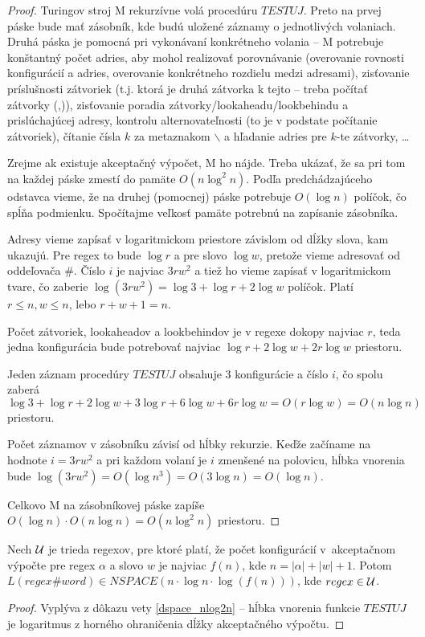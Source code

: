 \begin{proof}
Turingov stroj M rekurzívne volá procedúru $TESTUJ$. Preto na prvej páske bude mať zásobník, kde budú uložené záznamy o jednotlivých volaniach. Druhá páska je pomocná pri vykonávaní konkrétneho volania -- M potrebuje konštantný počet adries, aby mohol realizovať porovnávanie (overovanie rovnosti konfigurácií a adries, overovanie konkrétneho rozdielu medzi adresami), zisťovanie príslušnosti zátvoriek (t.j. ktorá je druhá zátvorka k tejto -- treba počítať zátvorky (,)), zisťovanie poradia zátvorky/lookaheadu/lookbehindu a prislúchajúcej adresy, kontrolu alternovateľnosti (to je v podstate počítanie zátvoriek), čítanie čísla $k$ za metaznakom $\backslash$ a hľadanie adries pre $k$-te zátvorky, \dots

Zrejme ak existuje akceptačný výpočet, M ho nájde. Treba ukázať, že sa pri tom na každej páske zmestí do pamäte $O(n\log^2 n)$. Podľa predchádzajúceho odstavca vieme, že na druhej (pomocnej) páske potrebuje $O(\log n)$ políčok, čo spĺňa podmienku. Spočítajme veľkosť pamäte potrebnú na zapísanie zásobníka.

Adresy vieme zapísať v logaritmickom priestore závislom od dĺžky slova, kam ukazujú. Pre regex to bude $\log r$ a pre slovo $\log w$, pretože vieme adresovať od oddeľovača \#. Číslo $i$ je najviac $3rw^2$ a tiež ho vieme zapísať v logaritmickom tvare, čo zaberie $\log (3rw^2) = \log 3 + \log r + 2\log w$ políčok. Platí $r\leq n, w\leq n$, lebo $r+w+1=n$.

Počet zátvoriek, lookaheadov a lookbehindov je v regexe dokopy najviac $r$, teda jedna konfigurácia bude potrebovať najviac $\log r + 2\log w + 2r\log w$ priestoru.

Jeden záznam procedúry $TESTUJ$ obsahuje 3 konfigurácie a číslo $i$, čo spolu zaberá $\log 3+\log r + 2\log w + 3\log r + 6\log w + 6r\log w = O(r\log w) = O(n\log n)$ priestoru.

Počet záznamov v zásobníku závisí od hĺbky rekurzie. Keďže začíname na hodnote $i=3rw^2$ a pri každom volaní je $i$ zmenšené na polovicu, hĺbka vnorenia bude $\log(3rw^2)=O(\log n^3) = O(3\log n) = O(\log n)$.

Celkovo M na zásobníkovej páske zapíše $O(\log n)\cdot O(n\log n) = O(n\log^2 n)$ priestoru.
\end{proof}

\begin{dosledok}
Nech $\cal U$ je trieda regexov, pre ktoré platí, že počet konfigurácií v~akceptačnom výpočte pre regex $\alpha$ a slovo $w$ je najviac $f(n)$, kde $n=|\alpha|+|w|+1$. Potom $L(regex\#word)\in NSPACE(n\cdot\log n\cdot \log (f(n)))$, kde $regex \in \cal U$.
\end{dosledok}
\begin{proof}
Vyplýva z dôkazu vety \ref{dspace_nlog2n} -- hĺbka vnorenia funkcie $TESTUJ$ je logaritmus z horného ohraničenia dĺžky akceptačného výpočtu.
\end{proof}

